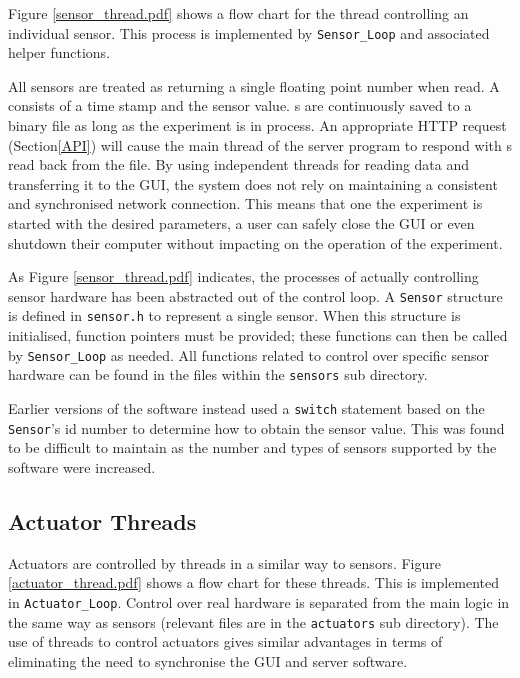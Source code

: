 Figure \ref{sensor_thread.pdf} shows a flow chart for the thread controlling an individual sensor. This process is implemented by \verb/Sensor_Loop/ and associated helper functions.

All sensors are treated as returning a single floating point number when read. A  consists of a time stamp and the sensor value. s are continuously saved to a binary file as long as the experiment is in process. An appropriate HTTP request (Section\ref{API}) will cause the main thread of the server program to respond with s read back from the file. By using independent threads for reading data and transferring it to the GUI, the system does not rely on maintaining a consistent and synchronised network connection. This means that one the experiment is started with the desired parameters, a user can safely close the GUI or even shutdown their computer without impacting on the operation of the experiment.



As Figure \ref{sensor_thread.pdf} indicates, the processes of actually controlling sensor hardware has been abstracted out of the control loop. A \verb/Sensor/ structure is defined in \verb/sensor.h/ to represent a single sensor. When this structure is initialised, function pointers must be provided; these functions can then be called by \verb/Sensor_Loop/ as needed. All functions related to control over specific sensor hardware can be found in the files within the \verb/sensors/ sub directory.

Earlier versions of the software instead used a \verb/switch/ statement based on the \verb/Sensor/'s id number to determine how to obtain the sensor value. This was found to be difficult to maintain as the number and types of sensors supported by the software were increased.



\subsection{Actuator Threads}\label{Actuator Thread}

Actuators are controlled by threads in a similar way to sensors. Figure \ref{actuator_thread.pdf} shows a flow chart for these threads. This is implemented in \verb/Actuator_Loop/. Control over real hardware is separated from the main logic in the same way as sensors (relevant files are in the \verb/actuators/ sub directory). The use of threads to control actuators gives similar advantages in terms of eliminating the need to synchronise the GUI and server software.


